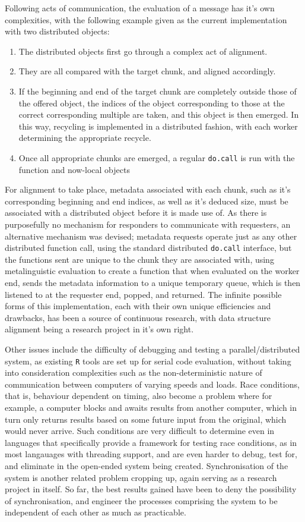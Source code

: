 Following acts of communication, the evaluation of a message has it's own complexities, with the following example given as the current implementation with two distributed objects:
\begin{enumerate}
	\item The distributed objects first go through a complex act of alignment.
	\item They are all compared with the target chunk, and aligned accordingly.
	\item If the beginning and end of the target chunk are completely outside those of the offered object, the indices of the object corresponding to those at the correct corresponding multiple are taken, and this object is then emerged.
		In this way, recycling is implemented in a distributed fashion, with each worker determining the appropriate recycle.
	\item Once all appropriate chunks are emerged, a regular \texttt{do.call} is run with the function and now-local objects
\end{enumerate}
For alignment to take place, metadata associated with each chunk, such as it's corresponding beginning and end indices, as well as it's deduced size, must be associated with a distributed object before it is made use of.
As there is purposefully no mechanism for responders to communicate with requesters, an alternative mechanism was devised; metadata requests operate just as any other distributed function call, using the standard distributed \texttt{do.call} interface, but the functions sent are unique to the chunk they are associated with, using metalinguistic evaluation to create a function that when evaluated on the worker end, sends the metadata information to a unique temporary queue, which is then listened to at the requester end, popped, and returned.
The infinite possible forms of this implementation, each with their own unique efficiencies and drawbacks, has been a source of continuous research, with data structure alignment being a research project in it's own right\cite{bryant2015computer}\cite{li1991data}.

Other issues include the difficulty of debugging and testing a parallel/distributed system, as existing \texttt{R} tools are set up for serial code evaluation, without taking into consideration complexities such as the non-deterministic nature of communication between computers of varying speeds and loads.
Race conditions, that is, behaviour dependent on timing, also become a problem where for example, a computer blocks and awaits results from another computer, which in turn only returns results based on some future input from the original, which would never arrive.
Such conditions are very difficult to determine even in languages that specifically provide a framework for testing race conditions, as in most langauages with threading support, and are even harder to debug, test for, and eliminate in the open-ended system being created\cite{serebryany2009threadsanitizer}.
Synchronisation of the system is another related problem cropping up, again serving as a research project in itself.
So far, the best results gained have been to deny the possibility of synchronisation, and engineer the processes comprising the system to be independent of each other as much as practicable.
